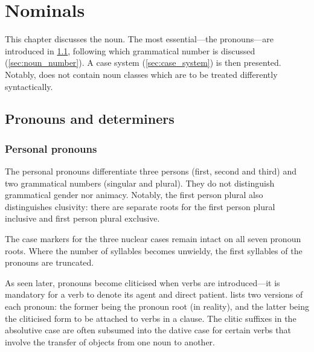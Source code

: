 \chapter{Nominals}
\label{cha:nominals}

This chapter discusses the \langname{} noun. The most essential---the pronouns---are
introduced in \cref{sec:pronouns}, following which grammatical number is discussed (\cref{sec:noun_number}).
A case system (\cref{sec:case_system}) is then presented.
Notably, \langname{} does not contain noun classes which are to be treated differently syntactically.

\section{Pronouns and determiners}
\label{sec:pronouns}

\subsection{Personal pronouns}
The personal pronouns differentiate three persons (first, second and third) and two grammatical numbers (singular and plural).
They do not distinguish grammatical gender nor animacy.
Notably, the first person plural also distinguishes clusivity: there are separate roots for the first
person plural inclusive and first person plural exclusive.

The case markers for the three nuclear cases remain intact on all seven
pronoun roots. Where the number of syllables becomes unwieldy, the first syllables
of the pronouns are truncated.

As seen later, pronouns become cliticised when verbs are introduced---it is mandatory for a verb
to denote its agent and direct patient.  lists two versions
of each pronoun: the former being the pronoun root (in reality), and the
latter being the cliticised form to be attached to verbs in a clause.
The clitic suffixes in the absolutive case are often subsumed into the dative case for certain verbs
that involve the transfer of objects from one noun to another.


